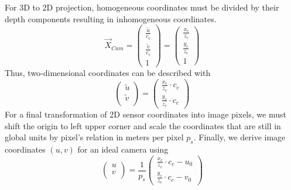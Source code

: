 \documentclass[review]{elsarticle}
\begin{document}
For 3D to 2D projection, homogeneous coordinates must be divided by their depth components resulting in inhomogeneous coordinates. 
\begin{equation}
\vec{X}_{Cam} =
\begin{pmatrix}
\frac{\tilde{u}}{c_c} \\
\frac{\tilde{v}}{c_c} \\
1
\end{pmatrix} = \begin{pmatrix}
\frac{x_c}{z_c} \\
\frac{y_c}{z_c} \\
1
\end{pmatrix}
\end{equation}
Thus, two-dimensional coordinates can be described with
\begin{equation}
\begin{pmatrix}
\tilde{u}\\
\tilde{v}\\
\end{pmatrix}
= \begin{pmatrix}
\frac{x_c}{z_c} \cdot c_c \\
\frac{y_c}{z_c}\cdot c_c
\end{pmatrix}
\label{eq:ut_vt}
\end{equation}
For a final transformation of 2D sensor coordinates into image pixels, we must shift the origin to left upper corner and scale the coordinates that are still in global units by pixel's relation in meters per pixel $p_s$. Finally, we derive image coordinates $(u,v)$ for an ideal camera using
\begin{equation}
\begin{pmatrix}
u\\
v\\
\end{pmatrix}
= \frac{1}{p_s}
\begin{pmatrix}
\frac{x_c}{z_c} \cdot c_c  - {u}_0 \\
\frac{y_c}{z_c}\cdot c_c  - {v}_0 
\end{pmatrix}
\label{eq:final_ps}
\end{equation}
\end{document}
